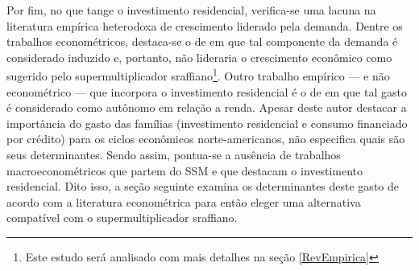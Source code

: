 
Por fim, no que tange o investimento residencial, verifica-se uma lacuna na literatura empírica heterodoxa de crescimento liderado pela demanda. 
Dentre os trabalhos econométricos, destaca-se o de \textcite{arestis_residential_2015} em que tal componente da demanda é considerado induzido e, portanto, não lideraria o crescimento econômico como sugerido pelo supermultiplicador sraffiano\footnote{Este estudo será analisado com mais detalhes na seção \ref{RevEmpirica}}.
Outro trabalho empírico --- e não econométrico --- que incorpora o investimento residencial é o de \textcite{fiebiger_semi-autonomous_2018} em que tal gasto é considerado como autônomo em relação a renda.
Apesar deste autor destacar a importância do gasto das famílias (investimento residencial e consumo financiado por crédito) para os ciclos econômicos norte-americanos, não especifica quais são seus determinantes.
Sendo assim, pontua-se a ausência de trabalhos macroeconométricos que partem do SSM e que destacam o investimento residencial.
Dito isso, a seção seguinte examina os determinantes deste gasto de acordo com a literatura econométrica  para então eleger uma alternativa compatível com o supermultiplicador sraffiano.


\begin{comment}
\textcite{deleidi_mission-oriented_2019}, por sua vez, estimam um SVAR para analisar
se o tipo de política fiscal adotada tem impactos sobre o crescimento no caso americano para o período de 1947 a 2018. Em linhas gerais, concluem que gastos orientados em setores mais intensivos em P\&D e em mudanças estrutuais (correspondente ao gasto v) possuem efeitos maiores sobre a taxa de crescimento do que uma política centrada apenas em incentivos fiscais. 

Vale retomar a compatibilidade do investimento residencial com o modelo do supermultiplicador sraffiano uma vez que (i) não cria   capacidade produtiva ao setor privado e (ii) pelas hipotecas serem a principal forma de financiamento (e não salários) de acordo com o \textit{Survey of Construction} \cite{us_census_bureau_characteristics_2017}. 
\end{comment}